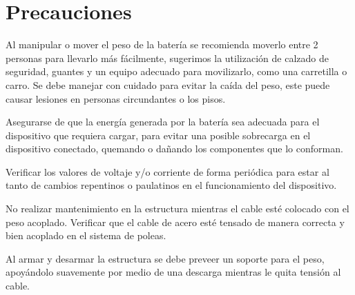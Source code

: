     \section{Precauciones} 
        Al manipular o mover el peso de la batería se recomienda moverlo entre 2 personas para llevarlo más fácilmente, sugerimos la utilización de calzado de seguridad, guantes y un equipo adecuado para movilizarlo, como una carretilla o carro. Se debe manejar con cuidado para evitar la caída del peso, este puede causar lesiones en personas circundantes o los pisos.\par
        Asegurarse de que la energía generada por la batería sea adecuada para el dispositivo que requiera cargar, para evitar una posible sobrecarga en el dispositivo conectado, quemando o dañando los componentes que lo conforman.\par
        Verificar los valores de voltaje y/o corriente de forma periódica para estar al tanto de cambios repentinos o paulatinos en el funcionamiento del dispositivo.\par
        No realizar mantenimiento en la estructura mientras el cable esté colocado con el peso acoplado.
        Verificar que el cable de acero esté tensado de manera correcta y bien acoplado en el sistema de poleas.\par
        Al armar y desarmar la estructura se debe preveer un soporte para el peso, apoyándolo suavemente por medio de una descarga mientras le quita tensión al cable.\par